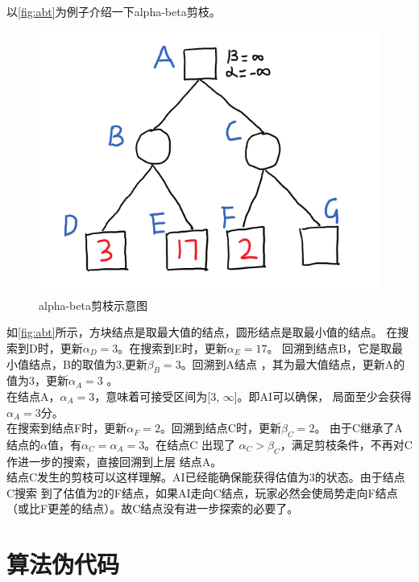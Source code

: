 \documentclass[a4paper]{article}
\begin{document}
以\autoref{fig:abt}为例子介绍一下alpha-beta剪枝。
\begin{figure}[!hbt]
    \begin{center}
    \includegraphics[scale=0.5]{assets/abt.png}
    \caption{alpha-beta剪枝示意图\label{fig:abt}} 
    \end{center} 
\end{figure} 

如\autoref{fig:abt}所示，方块结点是取最大值的结点，圆形结点是取最小值的结点。
在搜索到D时，更新$\alpha_D = 3$。在搜索到E时，更新$\alpha_E = 17$。 
回溯到结点B，它是取最小值结点，B的取值为3,更新$\beta_B = 3$。回溯到A结点
，其为最大值结点，更新A的值为3，更新$\alpha_A = 3$ 。\\

在结点A，$\alpha_A=3$，意味着可接受区间为[3, $\infty$]。即AI可以确保，
局面至少会获得$\alpha_A = 3$分。\\

在搜索到结点F时，更新$\alpha_F = 2$。回溯到结点C时，更新$\beta_C = 2$。
由于C继承了A结点的$\alpha$值，有$\alpha_C = \alpha_A = 3$。在结点C 出现了
$\alpha_C > \beta_C$，满足剪枝条件，不再对C作进一步的搜索，直接回溯到上层
结点A。\\

结点C发生的剪枝可以这样理解。AI已经能确保能获得估值为3的状态。由于结点C搜索
到了估值为2的F结点，如果AI走向C结点，玩家必然会使局势走向F结点
（或比F更差的结点）。故C结点没有进一步探索的必要了。

\section{算法伪代码}
\end{document}

